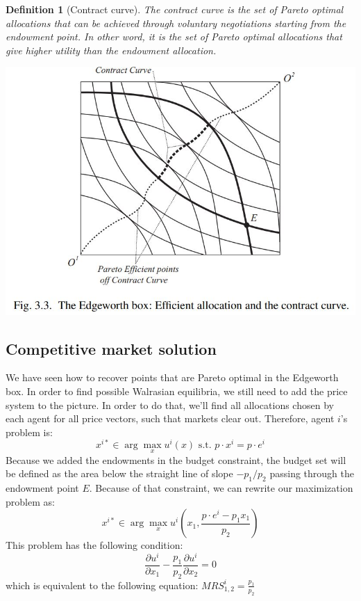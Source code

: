 \documentclass[12pt]{report}
\newtheorem{definition}{Definition}[chapter]
\begin{document}
\begin{definition}[Contract curve]
The contract curve is the set of Pareto optimal allocations that can be achieved through voluntary negotiations starting from the endowment point. In other word, it is the set of Pareto optimal allocations that give higher utility than the endowment allocation. 
\end{definition}

\begin{center}
\includegraphics[scale=0.55]{images/edge04}
\end{center}

\subsection{Competitive market solution}

We have seen how to recover points that are Pareto optimal in the Edgeworth box. In order to find possible Walrasian equilibria, we still need to add the price system to the picture. In order to do that, we'll find all allocations chosen by each agent for all price vectors, such that markets clear out. Therefore, agent $i$'s problem is: $$x^{i*} \in \operatorname{arg}\max_x u^i(x) \text{ s.t. } p\cdot x^i = p\cdot e^i $$ Because we added the endowments in the budget constraint, the budget set will be defined as the area below the straight line of slope $-p_1/p_2$ passing through the endowment point $E$. Because of that constraint, we can rewrite our maximization problem as: $$x^{i*} \in \operatorname{arg}\max_x u^i(x_1, \frac{p\cdot e^i - p_1 x_1 }{p_2} )$$ This problem has the following condition: $$\frac{\partial u^i}{\partial x_1} - \frac{p_1}{p_2}\frac{\partial u^i}{\partial x_2} = 0 $$ which is equivalent to the following equation: $MRS_{1,2}^i = \frac{p_1}{p_2}$
\end{document}
